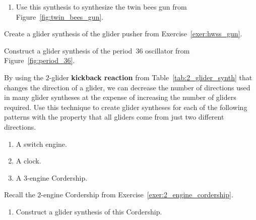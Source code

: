 \begin{multicols}{2}
\begin{problem}
\begin{enumerate}[label=\bf\color{ocre}(\alph*)]
			\item {} Use this synthesis to synthesize the twin bees gun from Figure~\ref{fig:twin_bees_gun}.
		\end{enumerate}
	\end{problem}
	
	
	\mfilbreak
	
	
	\begin{problem}\label{exer:synthesize_glider_pusher} 
		Create a glider synthesis of the glider pusher from Exercise~\ref{exer:hwss_gun}.
	\end{problem}
	
	
	\mfilbreak
	
	
	\begin{problem}\label{exer:oscillator_syntheses} 
		Construct a glider synthesis of the period~36 oscillator from Figure~\ref{fig:period_36}.
	\end{problem}
	
	
	\mfilbreak
	
	
	\begin{problemstar}\label{exer:glider_synth_two_directions}
		By using the $2$-glider \textbf{kickback reaction} from Table~\ref{tab:2_glider_synth} that changes the direction of a glider, we can decrease the number of directions used in many glider syntheses at the expense of increasing the number of gliders required. Use this technique to create glider syntheses for each of the following patterns with the property that all gliders come from just two different directions.\smallskip
		
		\begin{enumerate}[label=\bf\color{ocre}(\alph*)]
			\item {} A switch engine.
			
			\item {} A clock.
			
			\item {} A $3$-engine Cordership.
		\end{enumerate}
	\end{problemstar}
	
	
	\mfilbreak
	
	
	\begin{problemstar}\label{exer:2_engine_cordership_synthesis} 
		Recall the $2$-engine Cordership from Exercise~\ref{exer:2_engine_cordership}.\smallskip
		
		\begin{enumerate}[label=\bf\color{ocre}(\alph*)]
			\item Construct a glider synthesis of this Cordership.
			

\end{enumerate}
\end{problemstar}
\end{multicols}
